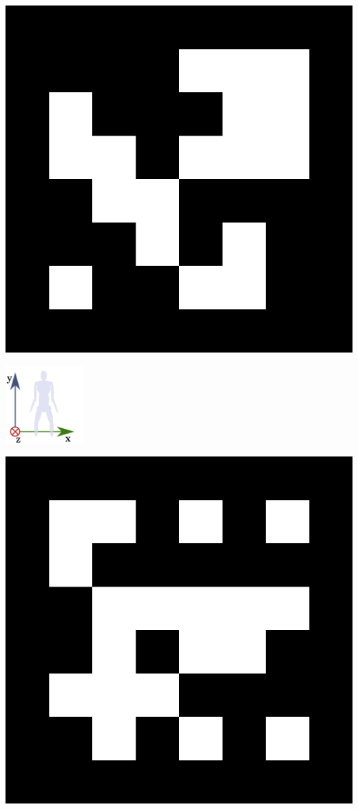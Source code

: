 \vspace{5cm}
\begin{center}
\includegraphics[width=\textwidth, keepaspectratio]{aruco_00.png}
\end{center}
\vspace{2cm}
\includegraphics[width=3cm, keepaspectratio]{origin_fig.png}
\newpage
\myemptypage
\vspace{5cm}
\begin{center}
\includegraphics[width=\textwidth, keepaspectratio]{aruco_04.png}
\end{center}
